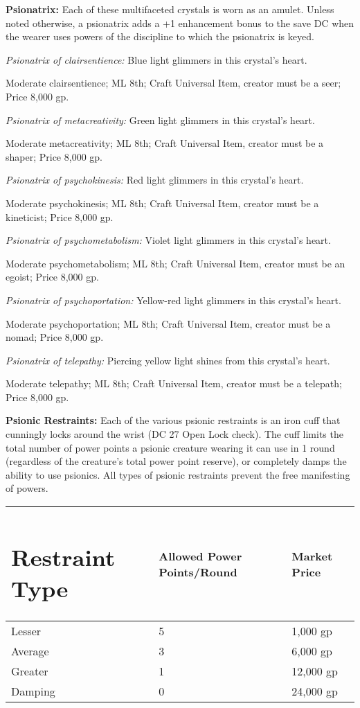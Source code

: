 \documentclass{article}
\begin{document}
\textbf{Psionatrix: }Each of these multifaceted crystals is worn as an amulet. 
Unless noted otherwise, a psionatrix adds a +1 enhancement bonus to the save DC 
when the wearer uses powers of the discipline to which the psionatrix is keyed.

\textit{Psionatrix of clairsentience: }Blue light glimmers in this crystal's heart. 

Moderate clairsentience; ML 8th; Craft Universal Item, creator must be a seer; 
Price 8,000 gp.

\textit{Psionatrix of metacreativity: }Green light glimmers in this crystal's heart.

Moderate metacreativity; ML 8th; Craft Universal Item, creator must be a shaper; 
Price 8,000 gp.

\textit{Psionatrix of psychokinesis: }Red light glimmers in this crystal's heart.

Moderate psychokinesis; ML 8th; Craft Universal Item, creator must be a kineticist; 
Price 8,000 gp.

\textit{Psionatrix of psychometabolism: }Violet light glimmers in this crystal's 
heart.

Moderate psychometabolism; ML 8th; Craft Universal Item, creator must be an egoist; 
Price 8,000 gp.

\textit{Psionatrix of psychoportation: }Yellow-red light glimmers in this crystal's 
heart.

Moderate psychoportation; ML 8th; Craft Universal Item, creator must be a nomad; 
Price 8,000 gp.

\textit{Psionatrix of telepathy: }Piercing yellow light shines from this crystal's 
heart.

Moderate telepathy; ML 8th; Craft Universal Item, creator must be a telepath; Price 
8,000 gp.

\textbf{Psionic Restraints:} Each of the various psionic restraints is an iron 
cuff that cunningly locks around the wrist (DC 27 Open Lock check). The cuff limits 
the total number of power points a psionic creature wearing it can use in 1 round 
(regardless of the creature's total power point reserve), or completely damps the 
ability to use psionics. All types of psionic restraints prevent the free manifesting 
of powers.

\begin{tabular}{|>{\raggedright}p{63pt}|>{\raggedright}p{70pt}|>{\raggedright}p{60pt}|}
\hline
\section*{R\textbf{estraint Type}} & A\textbf{llowed Power Points/Round} & M\textbf{arket 
Price}\tabularnewline
\hline
Lesser & 5 & 1,000 gp\tabularnewline
\hline
Average & 3 & 6,000 gp\tabularnewline
\hline
Greater & 1 & 12,000 gp\tabularnewline
\hline
Damping & 0 & 24,000 gp\tabularnewline
\hline
\end{tabular}
\end{document}
